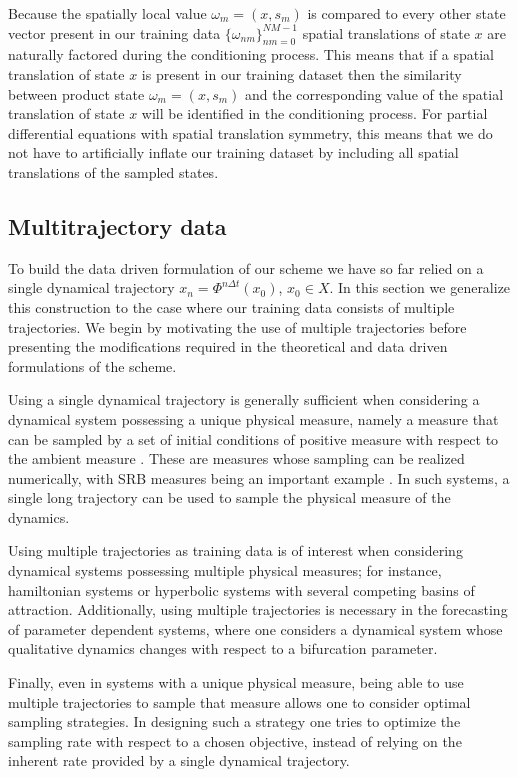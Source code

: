 \documentclass[letterpaper,10pt,3p,preprint]{elsarticle}
\begin{document}
Because the spatially local value $\omega_m=(x,s_m)$
is compared to every other state vector present in our training data
$\{\omega_{nm}\}_{nm=0}^{NM-1}$
spatial translations of state $x$ are naturally factored during
the conditioning process.
This means that if a spatial translation of state $x$ is present in
our training dataset then the similarity between product state
$\omega_m=(x,s_m)$
and the corresponding value of the spatial translation of state
$x$ will be identified in the conditioning process.
For partial differential equations with spatial translation
symmetry, this means that we do not have to artificially inflate
our training dataset by including all spatial translations of the
sampled states.

\subsection{Multitrajectory data}\label{sec:multitrajectory}
To build the data driven formulation of our scheme we have so far
relied on a single dynamical trajectory
$x_n=\Phi^{n\Delta t}(x_0)$, $x_0\in X$.
In this section we generalize this construction to the case where
our training data consists of multiple trajectories.
We begin by motivating the use of multiple trajectories
before presenting the modifications required in the
theoretical and data driven formulations of the scheme.

Using a single dynamical trajectory is generally sufficient when
considering a dynamical system possessing a unique physical measure,
namely a measure that can be sampled by a set of
initial conditions of positive measure with respect to the
ambient measure \cite{Blank2017}.
These are measures whose sampling can be realized numerically,
with SRB measures being an important example
\cite{LSYoung2002}.
In such systems, a single long trajectory can be used to sample
the physical measure of the dynamics.

Using multiple trajectories as training data is of interest
when considering dynamical systems possessing multiple
physical measures;
for instance, hamiltonian systems or hyperbolic systems with
several competing basins of attraction.
Additionally, using multiple trajectories is necessary in the
forecasting of parameter dependent systems,
where one considers a dynamical system whose qualitative
dynamics changes with respect to a bifurcation parameter.

Finally, even in systems with a unique physical measure,
being able to use multiple trajectories to sample
that measure allows one to consider optimal sampling
strategies.
In designing such a strategy one tries to optimize the sampling
rate with respect to a chosen objective,
instead of relying on the inherent rate provided
by a single dynamical trajectory.
\end{document}

